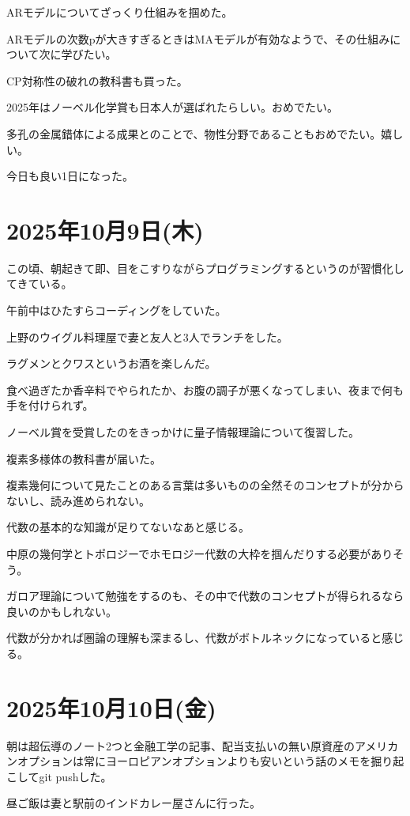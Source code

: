 \documentclass[uplatex]{jsarticle}
\begin{document}
ARモデルについてざっくり仕組みを掴めた。

ARモデルの次数pが大きすぎるときはMAモデルが有効なようで、その仕組みについて次に学びたい。

CP対称性の破れの教科書も買った。

2025年はノーベル化学賞も日本人が選ばれたらしい。おめでたい。

多孔の金属錯体による成果とのことで、物性分野であることもおめでたい。嬉しい。

今日も良い1日になった。


\section{2025年10月9日(木)}

この頃、朝起きて即、目をこすりながらプログラミングするというのが習慣化してきている。

午前中はひたすらコーディングをしていた。

上野のウイグル料理屋で妻と友人と3人でランチをした。

ラグメンとクワスというお酒を楽しんだ。

食べ過ぎたか香辛料でやられたか、お腹の調子が悪くなってしまい、夜まで何も手を付けられず。

ノーベル賞を受賞したのをきっかけに量子情報理論について復習した。

複素多様体の教科書が届いた。

複素幾何について見たことのある言葉は多いものの全然そのコンセプトが分からないし、読み進められない。

代数の基本的な知識が足りてないなあと感じる。

中原の幾何学とトポロジーでホモロジー代数の大枠を掴んだりする必要がありそう。

ガロア理論について勉強をするのも、その中で代数のコンセプトが得られるなら良いのかもしれない。

代数が分かれば圏論の理解も深まるし、代数がボトルネックになっていると感じる。


\section{2025年10月10日(金)}

朝は超伝導のノート2つと金融工学の記事、配当支払いの無い原資産のアメリカンオプションは常にヨーロピアンオプションよりも安いという話のメモを掘り起こしてgit pushした。

昼ご飯は妻と駅前のインドカレー屋さんに行った。
\end{document}
